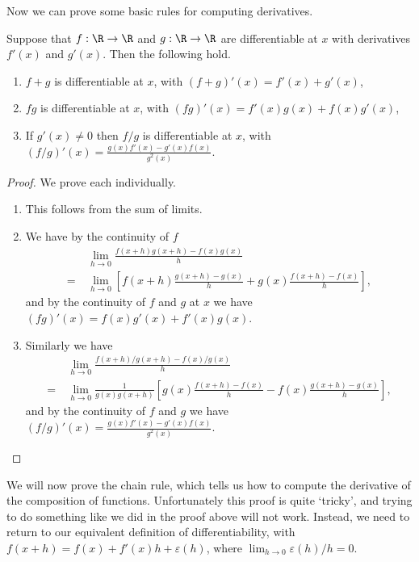\documentclass[a4paper]{scrartcl}
\begin{document}
Now we can prove some basic rules for computing derivatives.

\begin{proposition}
	Suppose that $f: \R \rightarrow \R$ and $g: \R \rightarrow \R$ are differentiable at $x$ with derivatives $f'(x)$ and $g'(x)$.
	Then the following hold.
	\begin{enumerate}[label=(\roman*)]
		\item $f + g$ is differentiable at $x$, with $(f + g)'(x)= f'(x) + g'(x)$,
		\item $fg$ is differentiable at $x$, with $(fg)'(x) = f'(x)g(x) + f(x)g'(x)$,
		\item If $g'(x) \neq 0$ then $f/g$ is differentiable at $x$, with $(f/g)'(x) = \frac{g(x)f'(x) - g'(x)f(x)}{g^2(x)}$.
	\end{enumerate}
\end{proposition}
\begin{proof}
	We prove each individually.
	\begin{enumerate}[label=(\roman*)]
		\item This follows from the sum of limits.
		\item We have by the continuity of $f$
		\begin{align*}
			&\lim_{h \to 0} \frac{f(x + h)g(x + h) - f(x)g(x)}{h} \\
			=\ &\lim_{h \to 0}\left[ f(x+h) \frac{g(x + h) - g(x)}{h} + g(x)\frac{f(x + h) - f(x)}{h}\right],
		\end{align*}
		and by the continuity of $f$ and $g$ at $x$ we have $(fg)'(x) = f(x)g'(x) + f'(x) g(x)$.
		\item Similarly we have
		\begin{align*}
			&\lim_{h \to 0} \frac{f(x + h)/g(x + h) - f(x)/g(x)}{h} \\
		=\ &\lim_{h \to 0} \frac{1}{g(x)g(x + h)} \left[g(x)\frac{f(x + h) - f(x)}{h} - f(x) \frac{g(x + h) - g(x)}{h}\right],
		\end{align*}
		and by the continuity of $f$ and $g$ we have $(f/g)'(x) = \frac{g(x)f'(x) - g'(x)f(x)}{g^2(x)}$. \qedhere
	\end{enumerate}
\end{proof}


We will now prove the chain rule, which tells us how to compute the derivative of the composition of functions. Unfortunately this proof is quite `tricky', and trying to do something like we did in the proof above will not work. Instead, we need to return to our equivalent definition of differentiability, with $f(x + h) = f(x) + f'(x) h + \varepsilon(h)$, where $\displaystyle\lim_{h \to 0}\varepsilon(h)/h = 0$.
\end{document}
